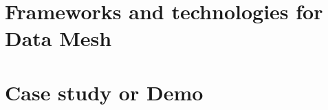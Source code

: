 \documentclass[12pt, a4paper]{book}
\begin{document}
\section{Frameworks and technologies for Data Mesh}

\section{Case study or Demo}


\begingroup
\backmatter
{}
\renewcommand\bibname{References}

\endgroup

\clearpage
\end{document}
